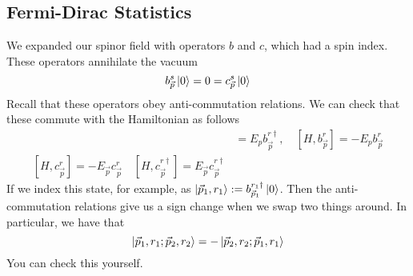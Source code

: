 \subsection{Fermi-Dirac Statistics} 
We expanded our spinor field with operators $ b  $ and $ c $, which 
had a spin index. These operators annihilate the vacuum 
\[
b_{ \vec{p} } ^ s \ket{ 0 }  = 0 =  c_{ \vec{p} } ^ s \ket{ 0 } 
\] Recall that these operators obey anti-commutation relations. 
We can check that these commute with the Hamiltonian as follows 
\begin{align*}
[ H , b_{ \vec{p} } ^{ r \dagger } ] &=  E _p b _{ \vec{p} } ^{ r \dagger }  , \quad \left[  H , b_{ \vec{p} } ^{ r  }  \right]  =   - E _ p b_{ \vec{p} } ^ r   \\
\left[  H, c _{ \vec{p}}^ r   \right]   = - E _{ \vec{p} } c _{ \vec{p} }^ r \quad  \left[  H , c_{\vec{p} } ^{ r \dagger }  \right]   = E_{ \vec{p} } 
c_{\vec{p} }^{ r \dagger }
\end{align*}
If we index this state, for example, as $ \ket{ \vec{p} _ 1, r _ 1 } : = b_{ \vec{p} _ 1 } ^{ r _ 1 \dagger } \ket{ 0 }  $. 
Then the anti-commutation relations give us a sign change when 
we swap two things around. In particular, 
we have that 
\[
\ket{ \vec{p} _ 1 , r _ 1 ; \vec{p} _ 2 , r _ 2 } =  - \ket{ \vec{p} _ 2 , r _ 2 ; \vec{p} _ 1 , r _ 1 } 
\]  You can check this yourself.  


